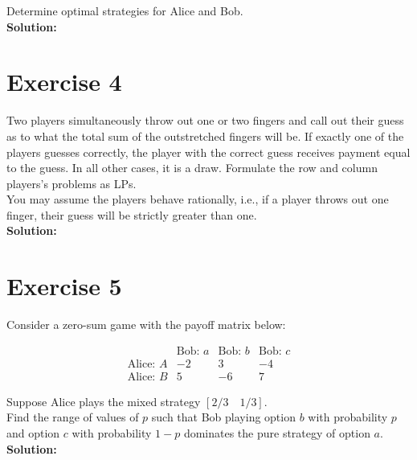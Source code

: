 \documentclass{article}
\begin{document}
Determine optimal strategies for Alice and Bob. \\

\textbf{Solution: } \\



\newpage

\section*{Exercise 4}
Two players simultaneously throw out one or two fingers and call out their guess as to what the total sum of the outstretched fingers will be. If exactly one of the players guesses correctly, the player with the correct guess receives payment equal to the guess. In all other cases, it is a draw. Formulate the row and column players's problems as LPs. \\

You may assume the players behave rationally, i.e., if a player throws out one finger, their guess will be strictly greater than one. \\

\textbf{Solution: } \\



\newpage

\section*{Exercise 5}
Consider a zero-sum game with the payoff matrix below:

$$\begin{array}{c|ccc}
& \text{Bob: } a & \text{Bob: } b & \text{Bob: } c \\
\hline
\text{Alice: } A & -2 & 3 & -4 \\
\text{Alice: } B & 5 & -6 & 7
\end{array}$$

Suppose Alice plays the mixed strategy $\left[2/3 \quad 1/3\right]$. \\

Find the range of values of $p$ such that Bob playing option $b$ with probability $p$ and option $c$ with probability $1 - p$ dominates the pure strategy of option $a$. \\

\textbf{Solution: } \\
\end{document}
